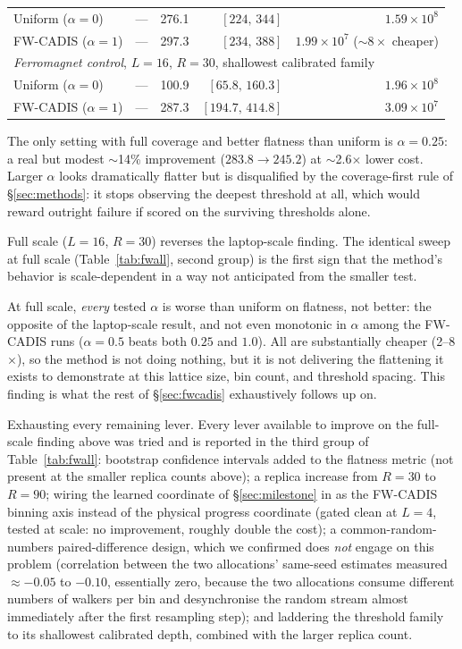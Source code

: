 \documentclass[a4paper,fleqn]{cas-sc}
\begin{document}
\begin{table}[H]
\begin{tabular}{lrrrr}
	Uniform ($\alpha=0$) & --- & 276.1 & $[224,\,344]$ & $1.59\times10^{8}$ \\
	FW-CADIS ($\alpha=1$) & --- & 297.3 & $[234,\,388]$ & $1.99\times10^{7}$ ($\sim\!8\times$ cheaper) \\
	\multicolumn{5}{l}{\emph{Ferromagnet control}, $L=16$, $R=30$, shallowest calibrated family} \\
	Uniform ($\alpha=0$) & --- & 100.9 & $[65.8,\,160.3]$ & $1.96\times10^{8}$ \\
	FW-CADIS ($\alpha=1$) & --- & 287.3 & $[194.7,\,414.8]$ & $3.09\times10^{7}$ \\
	\bottomrule
\end{tabular}
\end{table}

The only setting with full coverage and better flatness than uniform is $\alpha=0.25$: a
real but modest $\sim$14\% improvement ($283.8\to245.2$) at $\sim$2.6$\times$ lower cost.
Larger $\alpha$ looks dramatically flatter but is disqualified by the coverage-first rule
of \S\ref{sec:methods}: it stops observing the deepest threshold at all, which would reward
outright failure if scored on the surviving thresholds alone.

Full scale ($L=16$, $R=30$) reverses the laptop-scale finding. The identical sweep
at full scale (Table~\ref{tab:fwall}, second group) is the first sign that the method's
behavior is scale-dependent in a way not anticipated from the smaller test.

At full scale, \emph{every} tested $\alpha$ is worse than uniform on flatness, not better:
the opposite of the laptop-scale result, and not even monotonic in $\alpha$ among the
FW-CADIS runs ($\alpha=0.5$ beats both $0.25$ and $1.0$). All are substantially cheaper
(2--8$\times$), so the method is not doing nothing, but it is not delivering the flattening
it exists to demonstrate at this lattice size, bin count, and threshold spacing. This
finding is what the rest of \S\ref{sec:fwcadis} exhaustively follows up on.

Exhausting every remaining lever. Every lever available to improve on the full-scale
finding above was tried and is reported in the third group of Table~\ref{tab:fwall}:
bootstrap confidence
intervals added to the flatness metric (not present at the smaller replica counts above); a
replica increase from $R=30$ to $R=90$; wiring the learned coordinate of
\S\ref{sec:milestone} in as the FW-CADIS binning axis instead of the physical progress
coordinate (gated clean at $L=4$, tested at scale: no improvement, roughly double the
cost); a common-random-numbers paired-difference design, which we confirmed does
\emph{not} engage on this problem (correlation between the two allocations'
same-seed estimates measured $\approx-0.05$ to $-0.10$, essentially zero, because the two
allocations consume different numbers of walkers per bin and desynchronise the random
stream almost immediately after the first resampling step); and laddering the threshold
family to its shallowest calibrated depth, combined with the larger replica count.
\end{document}
